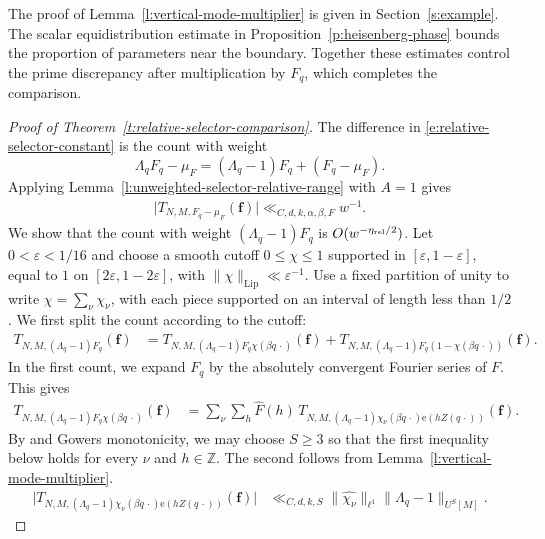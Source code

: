 \documentclass[12pt]{amsart}
\newcommand{\1}{\mathbf 1}
\newcommand{\e}{\mathrm e}
\theoremstyle{definition}
\begin{document}
The proof of Lemma~\ref{l:vertical-mode-multiplier} is given in
Section~\ref{s:example}. The scalar equidistribution estimate in
Proposition~\ref{p:heisenberg-phase} bounds the proportion of
parameters near the boundary. Together these estimates control
the prime discrepancy after multiplication by \(F_q\), which
completes the comparison.

\begin{proof}[Proof of Theorem~\ref{t:relative-selector-comparison}]
 The difference in
\eqref{e:relative-selector-constant} is the count with weight
\[
 \Lambda_qF_q-\mu_F=(\Lambda_q-1)F_q+(F_q-\mu_F).
\]
Applying Lemma~\ref{l:unweighted-selector-relative-range} with
\(A=1\) gives
\begin{align}\label{e:f-muf}
    \bigl|T_{N,M,F_q-\mu_F}(\mathbf f)\bigr|
 \ll_{C,d,k,\alpha,\beta,F} w^{-1}.
\end{align}
We show that the count
with weight \((\Lambda_q-1)F_q\) is \(O(w^{-\eta_{\rm rel}/2})\).
Let \(0<\varepsilon<1/16\) and choose a smooth cutoff
\(0\le\chi\le1\) supported in \([\varepsilon,1-\varepsilon]\),
equal to \(1\) on \([2\varepsilon,1-2\varepsilon]\), with
\(\|\chi\|_{\mathrm{Lip}}\ll\varepsilon^{-1}\). Use a fixed
partition of unity to write \(\chi=\sum_\nu\chi_\nu\), with each
piece supported on an interval of length less than \(1/2\).
We first split the count according to the cutoff:
\begin{align}\label{e:firstsecondterms}
 T_{N,M,(\Lambda_q-1)F_q}(\mathbf f)
 &=T_{N,M,(\Lambda_q-1)F_q\chi(\beta q\,\cdot)}(\mathbf f)+T_{N,M,(\Lambda_q-1)F_q(1-\chi(\beta q\,\cdot))}
   (\mathbf f).
\end{align}
In the first count, we expand \(F_q\) by the absolutely convergent
Fourier series of \(F\). This gives
\[
\begin{aligned}
 T_{N,M,(\Lambda_q-1)F_q\chi(\beta q\,\cdot)}(\mathbf f)
 &=\sum_\nu\sum_{h}\widehat F(h)\,
   T_{N,M,(\Lambda_q-1)\chi_\nu(\beta q\,\cdot)
     \e(hZ(q\,\cdot))}(\mathbf f).
\end{aligned}
\]
By \cite[Proposition~3.3]{KMTT} and Gowers monotonicity, we may
choose \(S\ge3\) so that the first inequality below holds for
every \(\nu\) and \(h\in\mathbb Z\). The second follows from
Lemma~\ref{l:vertical-mode-multiplier}.
\begin{equation}\label{e:high-order-gvn}
\begin{aligned}
 \bigl|T_{N,M,(\Lambda_q-1)\chi_\nu(\beta q\,\cdot)
                  \e(hZ(q\,\cdot))}(\mathbf f)\bigr|&\ll_{C,d,k,S}
 \|\widehat{\chi_\nu}\|_{\ell^1}\|\Lambda_q-1\|_{U^S[M]}.

\end{aligned}
\end{equation}
\end{proof}
\end{document}
